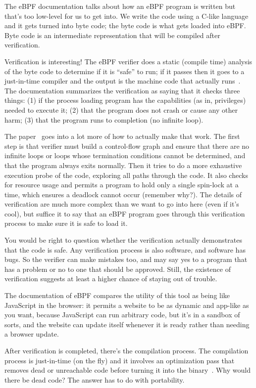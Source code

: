 The eBPF documentation talks about how an eBPF program is written but that's too low-level for us to get into. We write the code using a C-like language and it gets turned into byte code; the byte code is what gets loaded into eBPF. Byte code is an intermediate representation that will be compiled after verification. 

Verification is interesting! The eBPF verifier does a static (compile time) analysis of the byte code to determine if it is ``safe'' to run; if it passes then it goes to a just-in-time compiler and the output is the machine code that actually runs~\cite{ebpf}. The documentation summarizes the verification as saying that it checks three things: (1) if the process loading program has the capabilities (as in, privileges) needed to execute it; (2) that the program does not crash or cause any other harm; (3) that the program runs to completion (no infinite loop).

The paper~\cite{ebpf} goes into a lot more of how to actually make that work. The first step is that verifier must build a control-flow graph and ensure that there are no infinite loops or loops whose termination conditions cannot be determined, and that the program always exits normally. Then it tries to do a more exhaustive execution probe of the code, exploring all paths through the code. It also checks for resource usage and permits a program to hold only a single spin-lock at a time, which ensures a deadlock cannot occur (remember why?). The details of verification are much more complex than we want to go into here (even if it's cool), but suffice it to say that an eBPF program goes through this verification process to make sure it is safe to load it.

You would be right to question whether the verification actually demonstrates that the code is safe. Any verification process is also software, and software has bugs. So the verifier can make mistakes too, and may say yes to a program that has a problem or no to one that should be approved. Still, the existence of verification suggests at least a higher chance of staying out of trouble.

The documentation of eBPF compares the utility of this tool as being like JavaScript in the browser: it permits a website to be as dynamic and app-like as you want, because JavaScript can run arbitrary code, but it's in a sandbox of sorts, and the website can update itself whenever it is ready rather than needing a browser update. 

After verification is completed, there's the compilation process. The compilation process is just-in-time (on the fly) and it involves an optimization pass that removes dead or unreachable code before turning it into the binary~\cite{ebpf}. Why would there be dead code? The answer has to do with portability.

